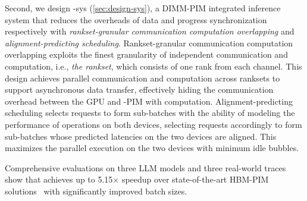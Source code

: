 Second, we design \sys-sys (\textsection\ref{sec:design-sys}), a DIMM-PIM integrated inference system that reduces the overheads of data and progress synchronization respectively with \emph{rankset-granular communication computation overlapping} and \emph{alignment-predicting scheduling}.
Rankset-granular communication computation overlapping exploits the finest granularity of independent communication and computation, i.e., \emph{the rankset}, which consists of one rank from each channel.
This design achieves parallel communication and computation across ranksets to support asynchronous data transfer, effectively hiding the communication overhead between the GPU and \sys-PIM with computation.
Alignment-predicting scheduling selects requests to form sub-batches with the ability of modeling the performance of operations on both devices, 
selecting requests accordingly to form sub-batches whose predicted latencies on the two devices are aligned.
This maximizes the parallel execution on the two devices with minimum idle bubbles.




Comprehensive evaluations on three LLM models and three real-world traces~\cite{open-r1,dophin,OpenThoughts-114k-math,bai2024longbench} show that \sys achieves up to 5.15$\times$ speedup over state-of-the-art HBM-PIM solutions~\cite{heo2024neupims,park2024attacc} with significantly improved batch sizes.



